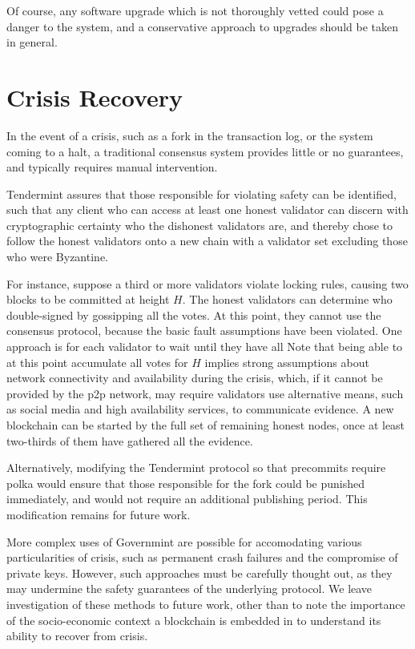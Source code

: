 Of course, any software upgrade which is not thoroughly vetted could pose a danger to the system,
and a conservative approach to upgrades should be taken in general.

\section{Crisis Recovery}

In the event of a crisis, such as a fork in the transaction log,
or the system coming to a halt, 
a traditional consensus system provides little or no guarantees,
and typically requires manual intervention.

Tendermint assures that those responsible for violating safety can be identified,
such that any client who can access at least one honest validator 
can discern with cryptographic certainty who the dishonest validators are,
and thereby chose to follow the honest validators onto a new chain with a validator set excluding those who were Byzantine.

For instance, suppose a third or more validators violate locking rules,
causing two blocks to be committed at height $H$.
The honest validators can determine who double-signed by gossipping all the votes.
At this point, they cannot use the consensus protocol, because the basic fault assumptions have been violated.
One approach is for each validator to wait until they have all 
Note that being able to at this point accumulate all votes for $H$ 
implies strong assumptions about network connectivity and availability during the crisis,
which, if it cannot be provided by the p2p network, may require validators use alternative means, 
such as social media and high availability services, to communicate evidence.
A new blockchain can be started by the full set of remaining honest nodes, 
once at least two-thirds of them have gathered all the evidence.

Alternatively, modifying the Tendermint protocol so that precommits require polka
would ensure that those responsible for the fork could be punished immediately,
and would not require an additional publishing period. 
This modification remains for future work.

More complex uses of Governmint are possible for accomodating various particularities of crisis,
such as permanent crash failures and the compromise of private keys.
However, such approaches must be carefully thought out, 
as they may undermine the safety guarantees of the underlying protocol.
We leave investigation of these methods to future work, 
other than to note the importance of the socio-economic context a blockchain is embedded in to understand its ability to recover from crisis.

